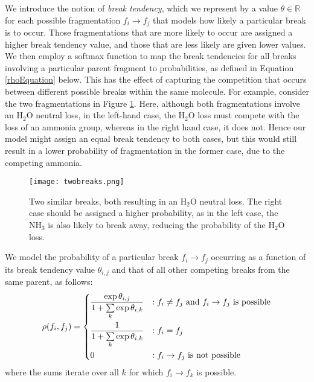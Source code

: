 We introduce the notion of \emph{break tendency}, which we represent by a value $\theta \in \mathbb{R}$ for each possible fragmentation $f_{i}\rightarrow f_{j}$ that models how likely a particular break is to occur. 
Those fragmentations that are more likely to occur are assigned a higher break tendency value, and those that are less likely are given lower values.  
We then employ a softmax function to map the break tendencies for all breaks involving a particular parent fragment to probabilities, as defined in Equation \ref{rhoEquation} below. 
This has the effect of capturing the competition that occurs between different possible breaks within the same molecule.
For example, consider the two fragmentations in Figure \ref{fig:twobreaks}.
Here, although both fragmentations involve an H$_{2}$O neutral loss, in the left-hand case, the H$_{2}$O loss must compete with the loss of an ammonia group, whereas in the right hand case, it does not.
Hence our model might assign an equal break tendency to both cases, but this would still result in a lower probability of fragmentation in the former case, due to the competing ammonia.
 
\begin{figure}[!tpb]
\begin{center}
\texttt{[image: twobreaks.png]}
\caption{\label{fig:twobreaks}Two similar breaks, both resulting in an H$_{2}$O neutral loss. 
The right case should be assigned a higher probability, as in the left case, the NH$_{3}$ is also likely to break away, reducing the probability of the H$_{2}$O loss.}
\end{center}
\end{figure}

We model the probability of a particular break $f_{i} \rightarrow f_{j}$ occurring as a function of its break tendency value $\theta_{i,j}$ and that of all other competing breaks from the same parent, as follows:
\begin{equation}
\label{rhoEquation}
\rho(f_{i},f_{j}) = 
\begin{dcases}
\frac{\exp{\theta_{i,j}}}{1 + \sum\limits_{k}\exp{\theta_{i,k}}} & : f_{i}\neq f_{j} \text{ and } f_{i} \rightarrow f_{j} \text{ is possible} \\
\frac{1}{1 + \sum\limits_{k}\exp{\theta_{i,k}}} & : f_{i}=f_{j}\\
0 & :  f_{i} \rightarrow f_{j} \text{ is not possible}
\end{dcases}
\end{equation}
where the sums iterate over all $k$ for which $f_{i} \rightarrow f_{k}$ is possible. 

